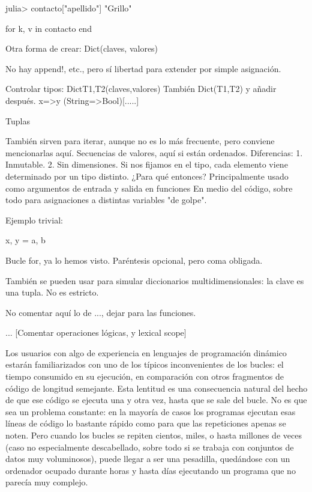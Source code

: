 ﻿\documentclass[spanish]{article}
\begin{document}
julia> contacto["apellido"]
"Grillo"

for k, v in contacto
end

Otra forma de crear: Dict(claves, valores)

No hay append!, etc., pero sí libertad para extender por simple asignación.

Controlar tipos:
 Dict{T1,T2}(claves,valores)
 También Dict(T1,T2) y añadir después.
 {x=>y}
(String=>Bool)[.....]

Tuplas

También sirven para iterar, aunque no es lo más frecuente, pero conviene
mencionarlas aquí.
Secuencias de valores, aquí si están ordenados. Diferencias:
1. Inmutable. 2. Sin dimensiones. Si nos fijamos en el tipo, cada elemento viene determinado
por un tipo distinto.
¿Para qué entonces?
Principalmente usado como argumentos de entrada y salida en funciones
En medio del código, sobre todo para asignaciones a distintas variables
"de golpe".

Ejemplo trivial:

x, y = a, b

Bucle for, ya lo hemos visto.
Paréntesis opcional, pero coma obligada.

También se pueden usar para simular diccionarios multidimensionales:
la clave es una tupla. No es estricto.

No comentar aquí lo de ..., dejar para las funciones.






...
[Comentar operaciones lógicas, y lexical scope]

Los usuarios con algo de experiencia en lenguajes de programación
dinámico estarán familiarizados con uno de los típicos inconvenientes
de los bucles: el tiempo consumido en su ejecución, en comparación con otros
fragmentos de código de longitud semejante. Esta lentitud es una
consecuencia natural del hecho de que ese código se ejecuta una y otra vez,
hasta que se sale del bucle. No es que sea un problema constante:
en la mayoría de casos los programas ejecutan esas líneas de código lo
bastante rápido como para que las repeticiones apenas se noten. Pero
cuando los bucles se repiten cientos, miles, o hasta millones de veces
(caso no especialmente descabellado, sobre todo si se trabaja con
conjuntos de datos muy voluminosos), puede llegar a ser una pesadilla,
quedándose con un ordenador ocupado durante horas y hasta días
ejecutando un programa que no parecía muy complejo.
\end{document}
